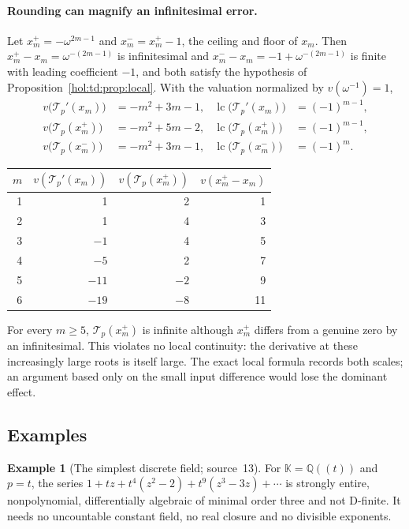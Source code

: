 \documentclass[11pt]{article}
\numberwithin{equation}{section}
\theoremstyle{definition}
\newtheorem{example}[theorem]{Example}
\theoremstyle{remark}
\newcommand{\Q}{\mathbb Q}
\newcommand{\lc}{\operatorname{lc}}
\newcommand{\KK}{\mathbb K}
\begin{document}
\paragraph{Rounding can magnify an infinitesimal error.}
Let $x_m^+=-\omega^{2m-1}$ and $x_m^-=x_m^+-1$, the ceiling and floor of
$x_m$. Then $x_m^+-x_m=\omega^{-(2m-1)}$ is infinitesimal and
$x_m^--x_m=-1+\omega^{-(2m-1)}$ is finite with leading coefficient $-1$, and
both satisfy the hypothesis of Proposition~\ref{hol:td:prop:local}. With the
valuation normalized by $v(\omega^{-1})=1$,
\begin{align}
 v\bigl(\mathcal T_p'(x_m)\bigr)&=-m^2+3m-1,&
 \lc\bigl(\mathcal T_p'(x_m)\bigr)&=(-1)^{m-1},\label{hol:td:eq:valder}\\
 v\bigl(\mathcal T_p(x_m^+)\bigr)&=-m^2+5m-2,&
 \lc\bigl(\mathcal T_p(x_m^+)\bigr)&=(-1)^{m-1},\label{hol:td:eq:valceil}\\
 v\bigl(\mathcal T_p(x_m^-)\bigr)&=-m^2+3m-1,&
 \lc\bigl(\mathcal T_p(x_m^-)\bigr)&=(-1)^m.\label{hol:td:eq:valfloor}
\end{align}
\begin{center}
\begin{tabular}{rrrr}
\toprule
$m$ & $v(\mathcal T_p'(x_m))$ & $v(\mathcal T_p(x_m^+))$ & $v(x_m^+-x_m)$\\
\midrule
1 & 1 & 2 & 1\\
2 & 1 & 4 & 3\\
3 & $-1$ & 4 & 5\\
4 & $-5$ & 2 & 7\\
5 & $-11$ & $-2$ & 9\\
6 & $-19$ & $-8$ & 11\\
\bottomrule
\end{tabular}
\end{center}
For every $m\ge5$, $\mathcal T_p(x_m^+)$ is infinite although $x_m^+$ differs
from a genuine zero by an infinitesimal. This violates no local continuity:
the derivative at these increasingly large roots is itself large. The exact
local formula records both scales; an argument based only on the small input
difference would lose the dominant effect.

\subsection{Examples}\label{hol:td:sub:examples}

\begin{example}[The simplest discrete field; source~13]\label{hol:td:ex:discrete}
For $\KK=\Q((t))$ and $p=t$, the series
$1+tz+t^4(z^2-2)+t^9(z^3-3z)+\cdots$ is strongly entire, nonpolynomial,
differentially algebraic of minimal order three and not D-finite. It needs no
uncountable constant field, no real closure and no divisible exponents.
\end{example}
\end{document}
